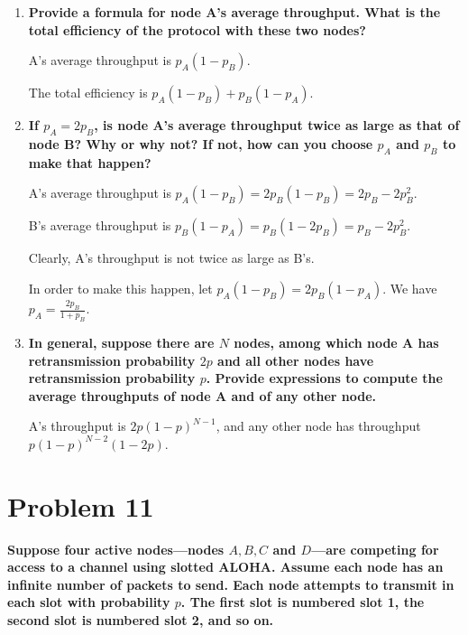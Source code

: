 \documentclass[11pt]{article}
\newenvironment{qparts}{\begin{enumerate}[{(}a{)}]}{\end{enumerate}}
\begin{document}
\begin{qparts}
	\item \textbf{Provide a formula for node A's average throughput. What is the total efficiency of the protocol with these two nodes?}
	
	A's average throughput is $p_A(1 - p_B)$.
	
	The total efficiency is $p_A(1 - p_B) + p_B(1 - p_A)$.
	
	\item \textbf{If $p_A = 2p_B$, is node A's average throughput twice as large as that of node B? Why or why not? If not, how can you choose $p_A$ and $p_B$ to make that happen?}

	A's average throughput is $p_A(1 - p_B) = 2p_B(1 - p_B) = 2p_B - 2p_B^2$.
	
	B's average throughput is $p_B(1 - p_A) = p_B(1 - 2p_B) = p_B - 2p_B^2$.
	
	Clearly, A's throughput is not twice as large as B's.
	
	In order to make this happen, let $p_A(1 - p_B) = 2p_B(1 - p_A)$. We have $p_A = \frac{2p_B}{1+p_B}$.
	
	\item \textbf{In general, suppose there are $N$ nodes, among which node A has retransmission probability $2p$ and all other nodes have retransmission probability $p$. Provide expressions to compute the average throughputs of node A and of any other node.}
	
	A's throughput is $2p(1-p)^{N-1}$, and any other node has throughput $p(1-p)^{N-2}(1-2p)$.

\end{qparts}



\newpage
\section{Problem 11}

\textbf{Suppose four active nodes—nodes $A, B, C$ and $D$—are competing for access to a channel using slotted ALOHA. Assume each node has an infinite number of packets to send. Each node attempts to transmit in each slot with probability $p$. The first slot is numbered slot 1, the second slot is numbered slot 2, and so on.}
\end{document}
